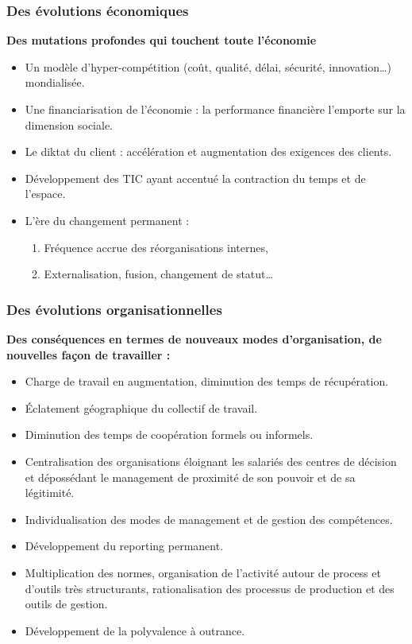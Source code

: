 \documentclass{beamer}
\begin{document}
\begin{frame}
\frametitle{Des évolutions économiques}

\textbf{Des mutations profondes qui touchent toute l’économie}  
\begin{itemize}
\item Un modèle d’hyper-compétition (coût, qualité, délai, sécurité, innovation…) mondialisée.

\item Une financiarisation de l’économie : la performance financière l’emporte sur la dimension sociale.

\item Le diktat du client : accélération et augmentation des exigences des clients.
 
\item Développement des TIC ayant accentué la contraction du temps et de l’espace.

\item L’ère du changement permanent :
	\begin{enumerate}
        \item Fréquence accrue des réorganisations internes,
		\item Externalisation, fusion, changement de statut… 
\end{enumerate}
\end{itemize}
\end{frame} 

\begin{frame}
\frametitle{Des évolutions organisationnelles}

\textbf{Des conséquences en termes de nouveaux modes d’organisation, de nouvelles façon de travailler :}  
\begin{itemize}
\item Charge de travail en augmentation, diminution des temps de récupération.

\item Éclatement géographique du collectif de travail.

\item Diminution des temps de coopération formels ou informels.

\item Centralisation des organisations éloignant les salariés des centres de décision et  dépossédant le management de proximité de son pouvoir et de sa légitimité.

\item Individualisation des modes de management et de gestion des compétences.

\item Développement du reporting permanent.

\item Multiplication des normes, organisation de l’activité autour de process et d’outils très structurants, 
rationalisation des processus de production et des outils de gestion.

\item Développement de la polyvalence à outrance.
\end{itemize}
\end{frame} 
\end{document}
